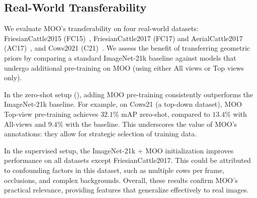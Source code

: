 \subsection{Real-World Transferability}
\label{subsec:real_world_transfer}

We evaluate MOO's transferability on four real-world datasets: FriesianCattle2015 (FC15)~\cite{andrewAutomaticIndividualHolstein2016}, FriesianCattle2017 (FC17) and AerialCattle2017 (AC17)~\cite{andrewVisualLocalisationIndividual2017}, and Cows2021 (C21)~\cite{gaoSelfSupervisionVideoIdentification2021b}.
We assess the benefit of transferring geometric priors by comparing a standard ImageNet-21k baseline against models that undergo additional pre-training on MOO (using either All views or Top views only).

In the zero-shot setup (), adding MOO pre-training consistently outperforms the ImageNet-21k baseline.
For example, on Cows21 (a top-down dataset), MOO Top-view pre-training achieves $32.1\%$ mAP zero-shot, compared to $13.4\%$ with All-views and $9.4\%$ with the baseline.
This underscores the value of MOO's annotations: they allow for strategic selection of training data.

In the supervised setup, the ImageNet-21k + MOO initialization improves performance on all datasets except FriesianCattle2017.
This could be attributed to confounding factors in this dataset, such as multiple cows per frame, occlusions, and complex backgrounds. %
Overall, these results confirm MOO's practical relevance, providing features that generalize effectively to real images.

